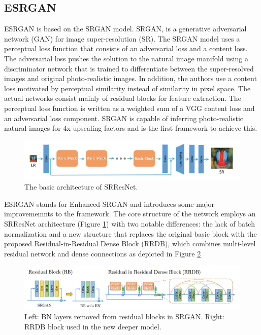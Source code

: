 \subsection{ESRGAN}
\label{subsec:esrgan}

ESRGAN is based on the SRGAN\cite{ledig2017photorealistic} model. SRGAN, is a generative adversarial network (GAN) for image super-resolution (SR). The SRGAN model uses a perceptual loss function that consists of an adversarial loss and a content loss. The adversarial loss pushes the solution to the natural image manifold using a discriminator network that is trained to differentiate between the super-resolved images and original photo-realistic images. In addition, the authors use a content loss motivated by perceptual similarity instead of similarity in pixel space. The actual networks consist mainly of residual blocks for feature extraction. The perceptual loss function is written as a weighted sum of a VGG content loss and an adversarial loss component. SRGAN is capable of inferring photo-realistic natural images for 4x upscaling factors and is the first framework to achieve this.

\begin{figure}[H]
  \centering
  \includegraphics[scale=0.25]{figures/SRResNet.png}
  \caption{The basic architecture of SRResNet.}
  \label{img:SRResNet}
\end{figure}

ESRGAN stands for Enhanced SRGAN and introduces some major improvememnts to the framework. The core structure of the network employs an SRResNet architecture (Figure \ref{img:SRResNet}) with two notable differences: the lack of batch normalization and a new structure that replaces the original basic block with the proposed Residual-in-Residual Dense Block (RRDB), which combines multi-level residual network and dense
connections as depicted in Figure \ref{img:RRDB}

\begin{figure}[H]
  \centering
  \includegraphics[scale=0.25]{figures/RRDB.png}
  \caption{Left: BN layers removed from residual blocks in SRGAN. Right: RRDB block used in the new deeper model.}
  \label{img:RRDB}
\end{figure}



